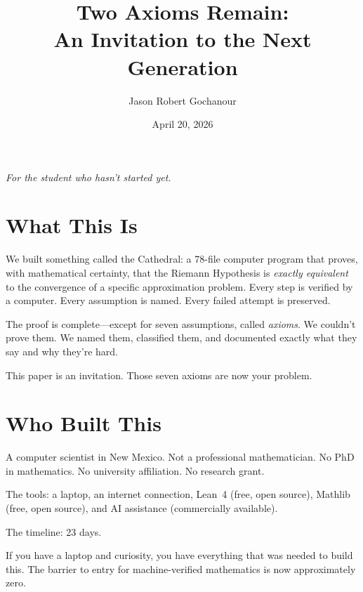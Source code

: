 \documentclass[11pt,a4paper]{article}
\title{%
  Two Axioms Remain:\\
  An Invitation to the Next Generation%
}
\author{
  Jason Robert Gochanour
}
\date{April 20, 2026}
\begin{document}
\maketitle

\begin{center}
\emph{For the student who hasn't started yet.}
\end{center}

\vspace{1cm}

\section*{What This Is}

We built something called the Cathedral: a 78-file computer program
that proves, with mathematical certainty, that the Riemann Hypothesis
is \emph{exactly equivalent} to the convergence of a specific
approximation problem. Every step is verified by a computer. Every
assumption is named. Every failed attempt is preserved.

The proof is complete---except for seven assumptions, called
\emph{axioms}. We couldn't prove them. We named them, classified
them, and documented exactly what they say and why they're hard.

This paper is an invitation. Those seven axioms are now your problem.

\section*{Who Built This}

A computer scientist in New Mexico. Not a professional mathematician.
No PhD in mathematics. No university affiliation. No research grant.

The tools: a laptop, an internet connection, Lean~4 (free, open
source), Mathlib (free, open source), and AI assistance (commercially
available).

The timeline: 23 days.

If you have a laptop and curiosity, you have everything that was
needed to build this. The barrier to entry for machine-verified
mathematics is now approximately zero.

\end{document}
